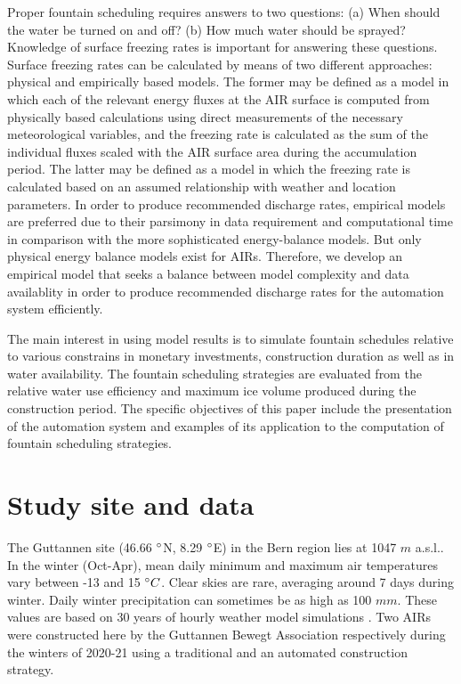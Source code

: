 \documentclass[tc, manuscript]{copernicus}
\begin{document}
Proper fountain scheduling requires answers to two questions: (a) When should the water be turned on and off?
(b) How much water should be sprayed? Knowledge of surface freezing rates is important for answering these
questions. Surface freezing rates can be calculated by means of two different approaches: physical and
empirically based models. The former may be defined as a model in which each of the relevant energy fluxes at
the AIR surface is computed from physically based calculations using direct measurements of the necessary
meteorological variables, and the freezing rate is calculated as the sum of the individual fluxes scaled with
the AIR surface area during the accumulation period. The latter may be defined as a model in which the freezing
rate is calculated based on an assumed relationship with weather and location parameters. In order to produce
recommended discharge rates, empirical models are preferred due to their parsimony in data requirement and
computational time in comparison with the more sophisticated energy-balance models. But only physical energy
balance models exist for AIRs. Therefore, we develop an empirical model that seeks a balance between model
complexity and data availablity in order to produce recommended discharge rates for the automation system
efficiently.

The main interest in using model results is to simulate fountain schedules relative to various constrains in
monetary investments, construction duration as well as in water availability. The fountain scheduling strategies
are evaluated from the relative water use efficiency and maximum ice volume produced during the construction
period. The specific objectives of this paper include the presentation of the automation system and examples of
its application to the computation of fountain scheduling strategies.

\section{Study site and data}

The Guttannen site (46.66 $^{\circ}$N, 8.29 $^{\circ}$E) in the Bern region lies at 1047 $m$ a.s.l.. In the winter
(Oct-Apr), mean daily minimum and maximum air temperatures vary between -13 and 15 $^{\circ} C$. Clear skies are
rare, averaging around 7 days during winter. Daily winter precipitation can sometimes be as high as 100 $mm$.
These values are based on 30 years of hourly weather model simulations \citep{guttannen}. Two AIRs were
constructed here by the Guttannen Bewegt Association respectively during the winters of 2020-21 using a
traditional and an automated construction strategy.
\end{document}
